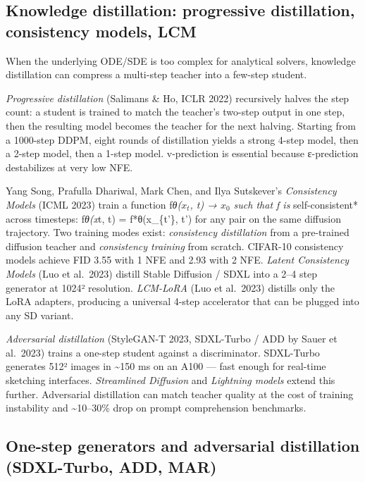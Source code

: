 \subsection{Knowledge distillation: progressive distillation, consistency models, LCM}\label{knowledge-distillation-progressive-distillation-consistency-models-lcm}

When the underlying ODE/SDE is too complex for analytical solvers, knowledge distillation can compress a multi-step teacher into a few-step student.

\emph{Progressive distillation} (Salimans \& Ho, ICLR 2022) recursively halves the step count: a student is trained to match the teacher's two-step output in one step, then the resulting model becomes the teacher for the next halving. Starting from a 1000-step DDPM, eight rounds of distillation yields a strong 4-step model, then a 2-step model, then a 1-step model. v-prediction is essential because ε-prediction destabilizes at very low NFE.

Yang Song, Prafulla Dhariwal, Mark Chen, and Ilya Sutskever's \emph{Consistency Models} (ICML 2023) train a function f\emph{θ(\(x_t\), t) → \(x_0\) such that f is }self-consistent* across timesteps: f\emph{θ(x}t, t) = f*θ(x\_\{t'\}, t') for any pair on the same diffusion trajectory. Two training modes exist: \emph{consistency distillation} from a pre-trained diffusion teacher and \emph{consistency training} from scratch. CIFAR-10 consistency models achieve FID 3.55 with 1 NFE and 2.93 with 2 NFE. \emph{Latent Consistency Models} (Luo et al.~2023) distill Stable Diffusion / SDXL into a 2--4 step generator at 1024² resolution. \emph{LCM-LoRA} (Luo et al.~2023) distills only the LoRA adapters, producing a universal 4-step accelerator that can be plugged into any SD variant.

\emph{Adversarial distillation} (StyleGAN-T 2023, SDXL-Turbo / ADD by Sauer et al.~2023) trains a one-step student against a discriminator. SDXL-Turbo generates 512² images in \textasciitilde150 ms on an A100 --- fast enough for real-time sketching interfaces. \emph{Streamlined Diffusion} and \emph{Lightning models} extend this further. Adversarial distillation can match teacher quality at the cost of training instability and \textasciitilde10--30\% drop on prompt comprehension benchmarks.

\subsection{One-step generators and adversarial distillation (SDXL-Turbo, ADD, MAR)}\label{one-step-generators-and-adversarial-distillation-sdxl-turbo-add-mar}

